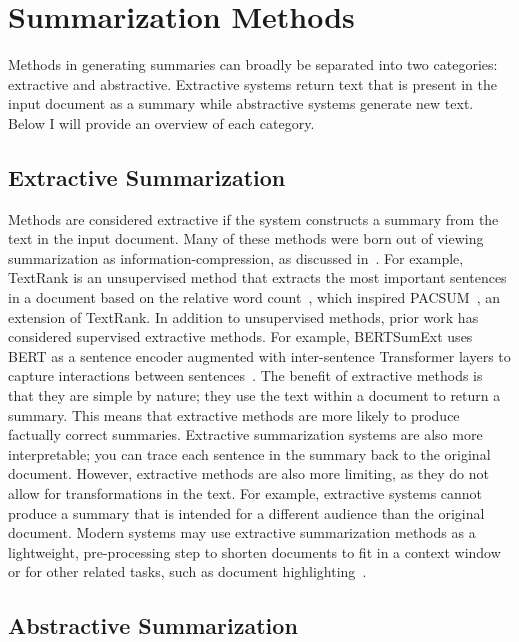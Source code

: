 \section{Summarization Methods}\label{sec:background-methods}

Methods in generating summaries can broadly be separated into two categories: extractive and abstractive. Extractive systems return text that is present in the input document as a summary while abstractive systems generate new text. Below I will provide an overview of each category.

\subsection{Extractive Summarization}

Methods are considered extractive if the system constructs a summary from the text in the input document. Many of these methods were born out of viewing summarization as information-compression, as discussed in~. For example, TextRank is an unsupervised method that extracts the most important sentences in a document based on the relative word count~\cite{Mihalcea2004TextRankBO}, which inspired PACSUM~\cite{Jie2023UnsupervisedES}, an extension of TextRank. In addition to unsupervised methods, prior work has considered supervised extractive methods. For example, BERTSumExt uses BERT as a sentence encoder augmented with inter-sentence Transformer layers to capture interactions between sentences~\cite{Liu2019TextSW}. The benefit of extractive methods is that they are simple by nature; they use the text within a document to return a summary. This means that extractive methods are more likely to produce factually correct summaries. Extractive summarization systems are also more interpretable; you can trace each sentence in the summary back to the original document. However, extractive methods are also more limiting, as they do not allow for transformations in the text. For example, extractive systems cannot produce a summary that is intended for a different audience than the original document. Modern systems may use extractive summarization methods as a lightweight, pre-processing step to shorten documents to fit in a context window~\cite{xu2020coarse, liu2023lost} or for other related tasks, such as document highlighting~\cite{Fok2023ScimIS}.

\subsection{Abstractive Summarization}

